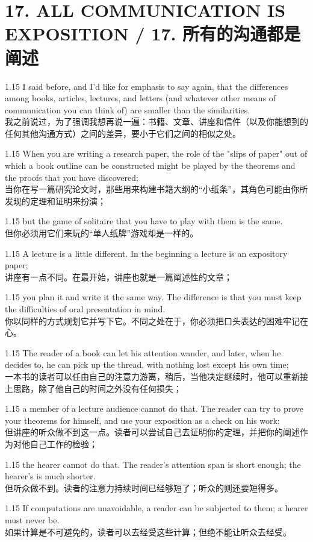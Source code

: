 \documentclass[12pt,a4paper]{article}
\newcommand{\bilingual}[2]{
    \begin{spacing}{1.15} %
        \noindent \normalsize #1 \\[-0.5ex] %
        \small \textcolor{blue!70!black}{#2} %
    \end{spacing}
    \vspace{0.8em} %
}
\begin{document}
\section*{17. ALL COMMUNICATION IS EXPOSITION / 17. 所有的沟通都是阐述} %

\bilingual{I said before, and I'd like for emphasis to say again, that the differences among books, articles, lectures, and letters (and whatever other means of communication you can think of) are smaller than the similarities.}
{我之前说过，为了强调我想再说一遍：书籍、文章、讲座和信件（以及你能想到的任何其他沟通方式）之间的差异，要小于它们之间的相似之处。} %

\bilingual{When you are writing a research paper, the role of the "slips of paper" out of which a book outline can be constructed might be played by the theorems and the proofs that you have discovered;}
{当你在写一篇研究论文时，那些用来构建书籍大纲的“小纸条”，其角色可能由你所发现的定理和证明来扮演；} %

\bilingual{but the game of solitaire that you have to play with them is the same.}
{但你必须用它们来玩的“单人纸牌”游戏却是一样的。} %

\bilingual{A lecture is a little different. In the beginning a lecture is an expository paper;}
{讲座有一点不同。在最开始，讲座也就是一篇阐述性的文章；} %

\bilingual{you plan it and write it the same way. The difference is that you must keep the difficulties of oral presentation in mind.}
{你以同样的方式规划它并写下它。不同之处在于，你必须把口头表达的困难牢记在心。} %

\bilingual{The reader of a book can let his attention wander, and later, when he decides to, he can pick up the thread, with nothing lost except his own time;}
{一本书的读者可以任由自己的注意力游离，稍后，当他决定继续时，他可以重新接上思路，除了他自己的时间之外没有任何损失；} %

\bilingual{a member of a lecture audience cannot do that. The reader can try to prove your theorems for himself, and use your exposition as a check on his work;}
{但讲座的听众做不到这一点。读者可以尝试自己去证明你的定理，并把你的阐述作为对他自己工作的检验；} %

\bilingual{the hearer cannot do that. The reader's attention span is short enough; the hearer's is much shorter.}
{但听众做不到。读者的注意力持续时间已经够短了；听众的则还要短得多。} %

\bilingual{If computations are unavoidable, a reader can be subjected to them; a hearer must never be.}
{如果计算是不可避免的，读者可以去经受这些计算；但绝不能让听众去经受。} %
\end{document}
